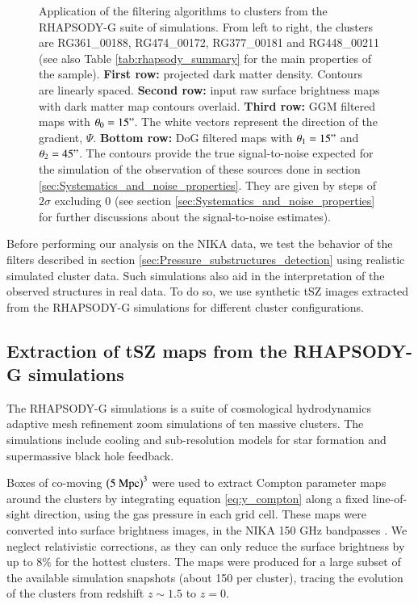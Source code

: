 \documentclass[twocolumn,traditabstract]{aa}
\begin{document}
\begin{figure}[h]
\caption{\footnotesize{Application of the filtering algorithms to clusters from the RHAPSODY-G suite of simulations. From left to right, the clusters are RG361\_00188, RG474\_00172, RG377\_00181 and RG448\_00211 (see also Table \ref{tab:rhapsody_summary} for the main properties of the sample). {\bf First row:} projected dark matter density. Contours are linearly spaced. {\bf Second row:} input raw surface brightness maps with dark matter map contours overlaid. {\bf Third row:} GGM filtered maps with $\theta_0 = 15"$. The white vectors represent the direction of the gradient, $\Psi$. {\bf Bottom row:} DoG filtered maps with $\theta_1 = 15"$ and $\theta_2 = 45"$. The contours provide the true signal-to-noise expected for the simulation of the observation of these sources done in section \ref{sec:Systematics_and_noise_properties}. They are given by steps of $2 \sigma$ excluding 0 (see section \ref{sec:Systematics_and_noise_properties} for further discussions about the signal-to-noise estimates).}}
\label{fig:RG_cluster_sample}
\end{figure}

Before performing our analysis on the NIKA data, we test the behavior of the filters described in section \ref{sec:Pressure_substructures_detection} using realistic simulated cluster data. Such simulations also aid in the interpretation of the observed structures in real data. To do so, we use synthetic tSZ images extracted from the RHAPSODY-G simulations for different cluster configurations.

\subsection{Extraction of tSZ maps from the RHAPSODY-G simulations}
The RHAPSODY-G simulations \citep{Wu2013,Hahn2017} is a suite of cosmological hydrodynamics adaptive mesh refinement zoom simulations of ten massive clusters. The simulations include cooling and sub-resolution models for star formation and supermassive black hole feedback. 

Boxes of co-moving $\left(5 \ {\rm Mpc}\right)^3$ were used to extract Compton parameter maps around the clusters by integrating equation \ref{eq:y_compton} along a fixed line-of-sight direction, using the gas pressure in each grid cell. These maps were converted into surface brightness images, in the NIKA 150 GHz bandpasses \citep[see the coefficient provided in][]{Adam2016b}. We neglect relativistic corrections, as they can only reduce the surface brightness by up to 8\% for the hottest clusters. 
The maps were produced for a large subset of the available simulation snapshots (about 150 per cluster), tracing the evolution of the clusters from redshift $z \sim 1.5$ to $z=0$.
\end{document}
